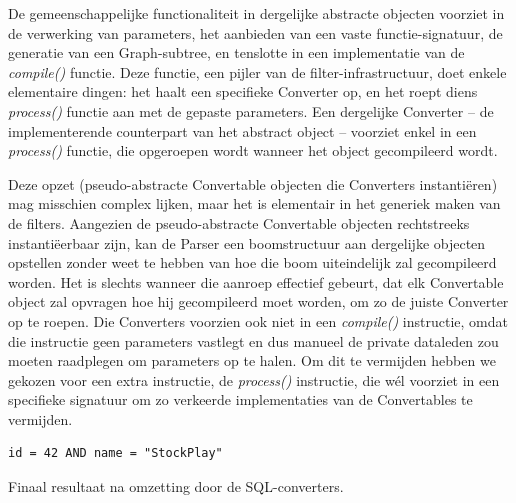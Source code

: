 De gemeenschappelijke functionaliteit in dergelijke abstracte objecten voorziet in de verwerking van parameters, het aanbieden van een vaste functie-signatuur, de generatie van een Graph-subtree, en tenslotte in een implementatie van de \emph{compile()} functie. Deze functie, een pijler van de filter-infrastructuur, doet enkele elementaire dingen: het haalt een specifieke Converter op, en het roept diens \emph{process()} functie aan met de gepaste parameters. Een dergelijke Converter -- de implementerende counterpart van het abstract object -- voorziet enkel in een \emph{process()} functie, die opgeroepen wordt wanneer het object gecompileerd wordt.

Deze opzet (pseudo-abstracte Convertable objecten die Converters instanti\"eren) mag misschien complex lijken, maar het is elementair in het generiek maken van de filters. Aangezien de pseudo-abstracte Convertable objecten rechtstreeks instanti\"eerbaar zijn, kan de Parser een boomstructuur aan dergelijke objecten opstellen zonder weet te hebben van hoe die boom uiteindelijk zal gecompileerd worden. Het is slechts wanneer die aanroep effectief gebeurt, dat elk Convertable object zal opvragen hoe hij gecompileerd moet worden, om zo de juiste Converter op te roepen. Die Converters voorzien ook niet in een \emph{compile()} instructie, omdat die instructie geen parameters vastlegt en dus manueel de private dataleden zou moeten raadplegen om parameters op te halen. Om dit te vermijden hebben we gekozen voor een extra instructie, de \emph{process()} instructie, die wél voorziet in een specifieke signatuur om zo verkeerde implementaties van de Convertables te vermijden.

\begin{code}
\begin{verbatim}
id = 42 AND name = "StockPlay"
\end{verbatim}
\caption{Finaal resultaat na omzetting door de SQL-converters.}
\end{code}

